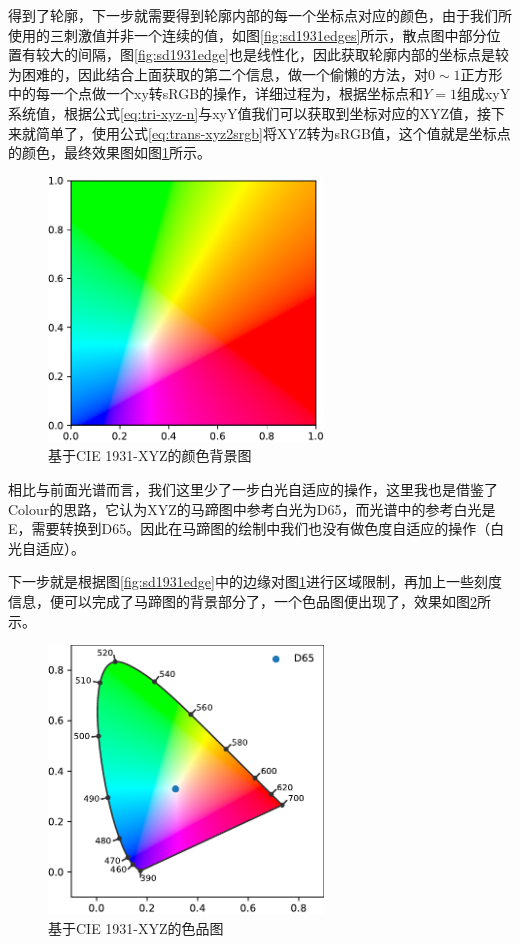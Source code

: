 得到了轮廓，下一步就需要得到轮廓内部的每一个坐标点对应的颜色，由于我们所使用的三刺激值并非一个连续的值，如图\ref{fig:sd1931edges}所示，散点图中部分位置有较大的间隔，图\ref{fig:sd1931edge}也是线性化，因此获取轮廓内部的坐标点是较为困难的，因此结合上面获取的第二个信息，做一个偷懒的方法，对$0\sim1$正方形中的每一个点做一个xy转sRGB的操作，详细过程为，根据坐标点和$Y=1$组成xyY系统值，根据公式\eqref{eq:tri-xyz-n}与xyY值我们可以获取到坐标对应的XYZ值，接下来就简单了，使用公式\eqref{eq:trans-xyz2srgb}将XYZ转为sRGB值，这个值就是坐标点的颜色，最终效果图如图\ref{fig:sd1931bgtotal}所示。

\begin{figure}[htbp]
    \centering
    \includegraphics[width=0.65\textwidth]{./imgs/sec3/cd-bg01.pdf}
    \caption{基于CIE 1931-XYZ的颜色背景图}
    \label{fig:sd1931bgtotal}
\end{figure}

相比与前面光谱而言，我们这里少了一步白光自适应的操作，这里我也是借鉴了Colour的思路，它认为XYZ的马蹄图中参考白光为D65，而光谱中的参考白光是E，需要转换到D65。因此在马蹄图的绘制中我们也没有做色度自适应的操作（白光自适应）。

下一步就是根据图\ref{fig:sd1931edge}中的边缘对图\ref{fig:sd1931bgtotal}进行区域限制，再加上一些刻度信息，便可以完成了马蹄图的背景部分了，一个色品图便出现了，效果如图\ref{fig:sd1931}所示。

\begin{figure}[htbp]
    \centering
    \includegraphics[width=0.65\textwidth]{./imgs/sec3/cd-bg.pdf}
    \caption{基于CIE 1931-XYZ的色品图}
    \label{fig:sd1931}
\end{figure}


